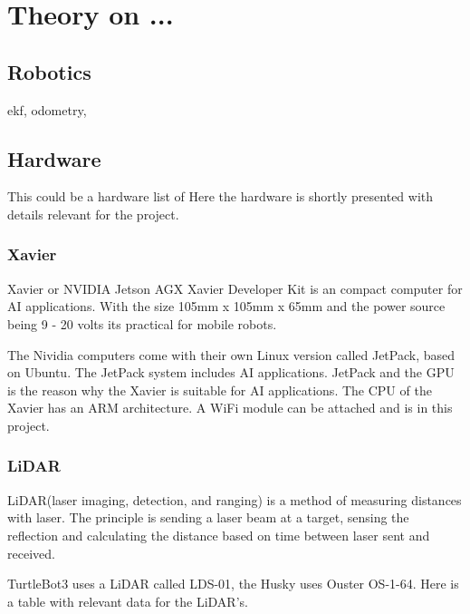 \chapter{Theory on ...}

\section{Robotics}
ekf, odometry, 

\section{Hardware}
This could be a hardware list of 
Here the hardware is shortly presented with details relevant for the project. 

\subsection{Xavier}
Xavier or NVIDIA Jetson AGX Xavier Developer Kit is an compact computer for AI applications. With the size 105mm x 105mm x 65mm and the power source being 9 - 20 volts its practical for mobile robots. 

The Nividia computers come with their own Linux version called JetPack, based on Ubuntu. The JetPack system includes AI applications. JetPack and the GPU is the reason why the Xavier is suitable for AI applications. The CPU of the Xavier has an ARM architecture. A WiFi module can be attached and is in this project.

\subsection{LiDAR}

LiDAR(laser imaging, detection, and ranging) is a method of measuring distances with laser. The principle is sending a laser beam at a target, sensing the reflection and calculating the distance based on time between laser sent and received. 

TurtleBot3 uses a LiDAR called LDS-01, the Husky uses Ouster OS-1-64. Here is a table with relevant data for the LiDAR's. 

